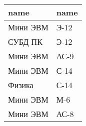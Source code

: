 \begin{tabular}{ll}
\toprule
name & name \\
\midrule
Мини ЭВМ & Э-12 \\
СУБД ПК & Э-12 \\
Мини ЭВМ & АС-9 \\
Мини ЭВМ & С-14 \\
Физика & С-14 \\
Мини ЭВМ & М-6 \\
Мини ЭВМ & АС-8 \\
\bottomrule
\end{tabular}
